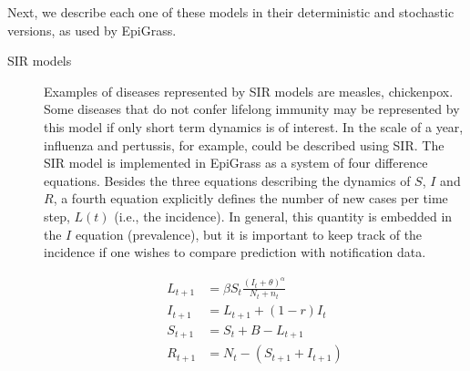 Next, we describe each one of these models in their deterministic and stochastic versions, as used by EpiGrass. 


\begin{description}
\item[SIR models]

Examples of diseases represented by SIR models are measles, chickenpox. Some diseases that do not confer lifelong immunity may be represented by this model if only short term dynamics is of interest. In the scale of a year, influenza and pertussis, for example, could be described using SIR. The SIR model is implemented in EpiGrass as a system of four difference equations. Besides the three equations describing the dynamics of $S$, $I$ and $R$, a fourth equation explicitly defines the number of new cases per time step, $L(t)$ (i.e., the incidence). In general, this quantity is embedded in the $I$ equation (prevalence), but it is important to keep track of the incidence if one wishes to compare prediction with notification data. 

\begin{align} \label{E:SIRmodel}
        L_{t+1} &= \beta S_t \frac{(I_t+\theta)^\alpha} {N_t+n_t}\nonumber \\
        I_{t+1} &= L_{t+1} + (1-r)I_t\nonumber\\
        S_{t+1} &= S_t + B - L_{t+1}\nonumber\\
        R_{t+1} &= N_t-(S_{t+1}+I_{t+1})
\end{align}


\end{description}
